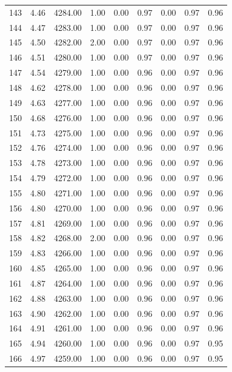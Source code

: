 \documentclass{article}\usepackage[]{graphicx}\usepackage[]{color}
\begin{document}
\begin{longtable}{rrrrrrrrr}
  143 & 4.46 & 4284.00 & 1.00 & 0.00 & 0.97 & 0.00 & 0.97 & 0.96 \\ 
  144 & 4.47 & 4283.00 & 1.00 & 0.00 & 0.97 & 0.00 & 0.97 & 0.96 \\ 
  145 & 4.50 & 4282.00 & 2.00 & 0.00 & 0.97 & 0.00 & 0.97 & 0.96 \\ 
  146 & 4.51 & 4280.00 & 1.00 & 0.00 & 0.97 & 0.00 & 0.97 & 0.96 \\ 
  147 & 4.54 & 4279.00 & 1.00 & 0.00 & 0.96 & 0.00 & 0.97 & 0.96 \\ 
  148 & 4.62 & 4278.00 & 1.00 & 0.00 & 0.96 & 0.00 & 0.97 & 0.96 \\ 
  149 & 4.63 & 4277.00 & 1.00 & 0.00 & 0.96 & 0.00 & 0.97 & 0.96 \\ 
  150 & 4.68 & 4276.00 & 1.00 & 0.00 & 0.96 & 0.00 & 0.97 & 0.96 \\ 
  151 & 4.73 & 4275.00 & 1.00 & 0.00 & 0.96 & 0.00 & 0.97 & 0.96 \\ 
  152 & 4.76 & 4274.00 & 1.00 & 0.00 & 0.96 & 0.00 & 0.97 & 0.96 \\ 
  153 & 4.78 & 4273.00 & 1.00 & 0.00 & 0.96 & 0.00 & 0.97 & 0.96 \\ 
  154 & 4.79 & 4272.00 & 1.00 & 0.00 & 0.96 & 0.00 & 0.97 & 0.96 \\ 
  155 & 4.80 & 4271.00 & 1.00 & 0.00 & 0.96 & 0.00 & 0.97 & 0.96 \\ 
  156 & 4.80 & 4270.00 & 1.00 & 0.00 & 0.96 & 0.00 & 0.97 & 0.96 \\ 
  157 & 4.81 & 4269.00 & 1.00 & 0.00 & 0.96 & 0.00 & 0.97 & 0.96 \\ 
  158 & 4.82 & 4268.00 & 2.00 & 0.00 & 0.96 & 0.00 & 0.97 & 0.96 \\ 
  159 & 4.83 & 4266.00 & 1.00 & 0.00 & 0.96 & 0.00 & 0.97 & 0.96 \\ 
  160 & 4.85 & 4265.00 & 1.00 & 0.00 & 0.96 & 0.00 & 0.97 & 0.96 \\ 
  161 & 4.87 & 4264.00 & 1.00 & 0.00 & 0.96 & 0.00 & 0.97 & 0.96 \\ 
  162 & 4.88 & 4263.00 & 1.00 & 0.00 & 0.96 & 0.00 & 0.97 & 0.96 \\ 
  163 & 4.90 & 4262.00 & 1.00 & 0.00 & 0.96 & 0.00 & 0.97 & 0.96 \\ 
  164 & 4.91 & 4261.00 & 1.00 & 0.00 & 0.96 & 0.00 & 0.97 & 0.96 \\ 
  165 & 4.94 & 4260.00 & 1.00 & 0.00 & 0.96 & 0.00 & 0.97 & 0.95 \\ 
  166 & 4.97 & 4259.00 & 1.00 & 0.00 & 0.96 & 0.00 & 0.97 & 0.95 \\ 

\end{longtable}
\end{document}
